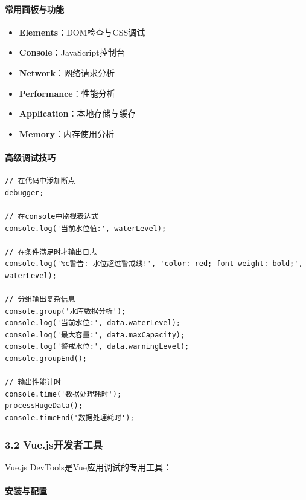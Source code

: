 \paragraph{常用面板与功能}\label{ux5e38ux7528ux9762ux677fux4e0eux529fux80fd}

\begin{itemize}
\tightlist
\item
  \textbf{Elements}：DOM检查与CSS调试
\item
  \textbf{Console}：JavaScript控制台
\item
  \textbf{Network}：网络请求分析
\item
  \textbf{Performance}：性能分析
\item
  \textbf{Application}：本地存储与缓存
\item
  \textbf{Memory}：内存使用分析
\end{itemize}

\paragraph{高级调试技巧}\label{ux9ad8ux7ea7ux8c03ux8bd5ux6280ux5de7}

\begin{lstlisting}
// 在代码中添加断点
debugger;

// 在console中监视表达式
console.log('当前水位值:', waterLevel);

// 在条件满足时才输出日志
console.log('%c警告: 水位超过警戒线!', 'color: red; font-weight: bold;', waterLevel);

// 分组输出复杂信息
console.group('水库数据分析');
console.log('当前水位:', data.waterLevel);
console.log('最大容量:', data.maxCapacity);
console.log('警戒水位:', data.warningLevel);
console.groupEnd();

// 输出性能计时
console.time('数据处理耗时');
processHugeData();
console.timeEnd('数据处理耗时');
\end{lstlisting}

\subsubsection{3.2
Vue.js开发者工具}\label{vue.jsux5f00ux53d1ux8005ux5de5ux5177}

Vue.js DevTools是Vue应用调试的专用工具：

\paragraph{安装与配置}\label{ux5b89ux88c5ux4e0eux914dux7f6e}

